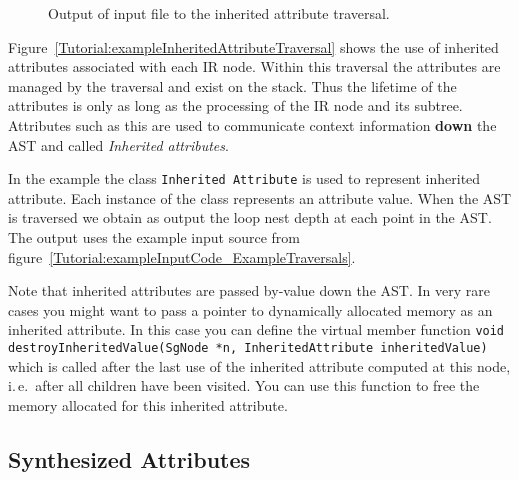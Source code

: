 \begin{figure}[!h]
{\indent
{\mySmallFontSize


\begin{latexonly}
   
\end{latexonly}

\begin{htmlonly}
   
\end{htmlonly}

}
}
\caption{Output of input file to the inherited attribute traversal.}
\label{Tutorial:exampleOutput_InheritedAttributeTraversal}
\end{figure}

Figure~\ref{Tutorial:exampleInheritedAttributeTraversal} shows the use
of inherited attributes associated with each IR node.  Within this
traversal the attributes are managed by the traversal and exist on the
stack.  Thus the lifetime of the attributes is only as long as the
processing of the IR node and its subtree.  Attributes such as this
are used to communicate context information {\bf down} the AST and
called {\em Inherited attributes}.

In the example the class \verb+Inherited Attribute+ is used to represent 
inherited attribute. Each instance of the class represents an attribute 
value. When the AST is traversed we obtain as output the loop nest depth 
at each point in the AST. The output uses the example input source from 
figure~\ref{Tutorial:exampleInputCode_ExampleTraversals}.

Note that inherited attributes are passed by-value down the AST. In very rare
cases you might want to pass a pointer to dynamically allocated memory as an
inherited attribute. In this case you can define the virtual member function
{\tt void destroyInheritedValue(SgNode *n, InheritedAttribute inheritedValue)}
which is called after the last use of the inherited attribute computed at this
node, i.\,e.~after all children have been visited. You can use this function
to free the memory allocated for this inherited attribute.




\clearpage
\subsection{Synthesized Attributes}

